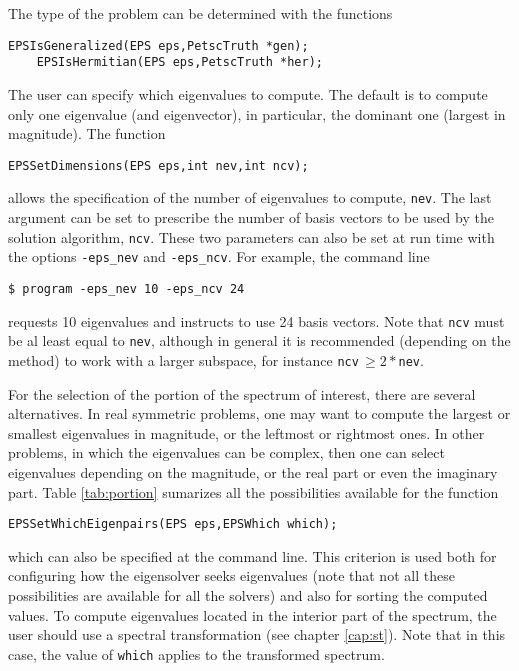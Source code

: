 	The type of the problem can be determined with the functions
	 
	\begin{Verbatim}[fontsize=\small]
	EPSIsGeneralized(EPS eps,PetscTruth *gen);
	EPSIsHermitian(EPS eps,PetscTruth *her);
	\end{Verbatim}

	The user can specify which eigenvalues to compute. The default is to compute only one eigenvalue (and eigenvector), in particular, the dominant one (largest in magnitude). The function
	\begin{Verbatim}[fontsize=\small]
	EPSSetDimensions(EPS eps,int nev,int ncv);
	\end{Verbatim}
allows the specification of the number of eigenvalues to compute, \texttt{nev}. The last argument can be set to prescribe the number of basis vectors to be used by the solution algorithm, \texttt{ncv}. These two parameters can also be set at run time with the options \Verb!-eps_nev! and \Verb!-eps_ncv!. For example, the command line
\begin{Verbatim}[fontsize=\small]
	$ program -eps_nev 10 -eps_ncv 24
\end{Verbatim}
requests 10 eigenvalues and instructs to use 24 basis vectors. Note that \texttt{ncv} must be al least equal to \texttt{nev}, although in general it is recommended (depending on the method) to work with a larger subspace, for instance \texttt{ncv}$\,\geq \!2*$\texttt{nev}.

	For the selection of the portion of the spectrum of interest, there are several alternatives. In real symmetric problems, one may want to compute the largest or smallest eigenvalues in magnitude, or the leftmost or rightmost ones. In other problems, in which the eigenvalues can be complex, then one can select eigenvalues depending on the magnitude, or the real part or even the imaginary part. Table \ref{tab:portion} sumarizes all the possibilities available for the function
	\begin{Verbatim}[fontsize=\small]
	EPSSetWhichEigenpairs(EPS eps,EPSWhich which);
	\end{Verbatim}
which can also be specified at the command line. This criterion is used both for configuring how the eigensolver seeks eigenvalues (note that not all these possibilities are available for all the solvers) and also for sorting the computed values. To compute eigenvalues located in the interior part of the spectrum, the user should use a spectral transformation (see chapter \ref{cap:st}). Note that in this case, the value of \Verb!which! applies to the transformed spectrum.

